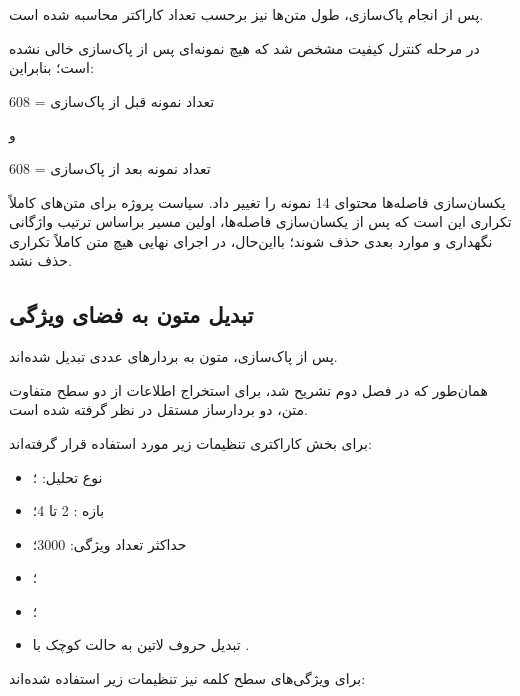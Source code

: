پس از انجام پاک‌سازی، طول متن‌ها نیز برحسب تعداد کاراکتر محاسبه شده است.

در مرحله کنترل کیفیت مشخص شد که هیچ نمونه‌ای پس از پاک‌سازی خالی نشده است؛ بنابراین:

\begin{center}
تعداد نمونه قبل از پاک‌سازی = 608
\end{center}

و

\begin{center}
تعداد نمونه بعد از پاک‌سازی = 608
\end{center}

یکسان‌سازی فاصله‌ها محتوای 14 نمونه را تغییر داد. سیاست پروژه برای متن‌های کاملاً تکراری این است که پس از یکسان‌سازی فاصله‌ها، اولین مسیر براساس ترتیب واژگانی نگهداری و موارد بعدی حذف شوند؛ بااین‌حال، در اجرای نهایی هیچ متن کاملاً تکراری حذف نشد.


\subsection{تبدیل متون به فضای ویژگی}

پس از پاک‌سازی، متون به بردارهای عددی تبدیل شده‌اند.

همان‌طور که در فصل دوم تشریح شد، برای استخراج اطلاعات از دو سطح متفاوت متن، دو بردارساز مستقل در نظر گرفته شده است.

برای بخش کاراکتری تنظیمات زیر مورد استفاده قرار گرفته‌اند:

\begin{itemize}

	\item نوع تحلیل:
	؛

	\item بازه
	:
	2 تا 4؛

	\item حداکثر تعداد ویژگی:
	3000؛

	\item
	؛

	\item
	؛

	\item تبدیل حروف لاتین به حالت کوچک با
	.

\end{itemize}

برای ویژگی‌های سطح کلمه نیز تنظیمات زیر استفاده شده‌اند:

